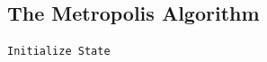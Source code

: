 \documentclass[10pt,showpacs,preprintnumbers,amsmath,amssymb,nofootinbib,aps,prl,twocolumn,groupedaddress,superscriptaddress,showkeys]{revtex4-1}
\begin{document}
  \subsection{The Metropolis Algorithm}

\begin{lstlisting}[mathescape=true, language=python, title=Metropolis Algorithm]
Initialize State 

\end{lstlisting}


  \begin{figure}[h!p]
    \centering
    \\
\end{figure}
\end{document}
